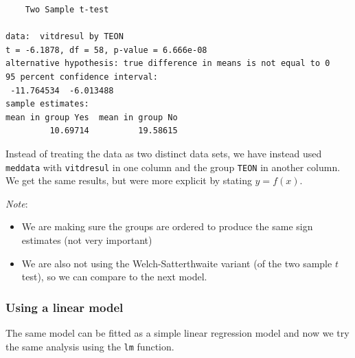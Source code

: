 \documentclass[
  oneside]{krantz}
\newenvironment{Shaded}{\begin{snugshade}}{\end{snugshade}}
\newcommand{\AttributeTok}[1]{\textcolor[rgb]{0.77,0.63,0.00}{#1}}
\newcommand{\FunctionTok}[1]{\textcolor[rgb]{0.00,0.00,0.00}{#1}}
\newcommand{\NormalTok}[1]{#1}
\newcommand{\OtherTok}[1]{\textcolor[rgb]{0.56,0.35,0.01}{#1}}
\newcommand{\SpecialCharTok}[1]{\textcolor[rgb]{0.00,0.00,0.00}{#1}}
\newcommand{\StringTok}[1]{\textcolor[rgb]{0.31,0.60,0.02}{#1}}
\providecommand{\tightlist}{%
  \setlength{\itemsep}{0pt}\setlength{\parskip}{0pt}}
\begin{document}
\begin{verbatim}
    Two Sample t-test

data:  vitdresul by TEON
t = -6.1878, df = 58, p-value = 6.666e-08
alternative hypothesis: true difference in means is not equal to 0
95 percent confidence interval:
 -11.764534  -6.013488
sample estimates:
mean in group Yes  mean in group No 
         10.69714          19.58615 
\end{verbatim}

Instead of treating the data as two distinct data sets, we have instead used \texttt{meddata} with \texttt{vitdresul} in one column and the group \texttt{TEON} in another column.
We get the same results, but were more explicit by stating \(y = f(x)\).

\emph{Note}:

\begin{itemize}
\tightlist
\item
  We are making sure the groups are ordered to produce the same sign estimates (not very important)
\item
  We are also not using the Welch-Satterthwaite variant (of the two sample \(t\) test), so we can compare to the next model.
\end{itemize}

\hypertarget{using-a-linear-model}{%
\subsubsection{Using a linear model}\label{using-a-linear-model}}

The same model can be fitted as a simple linear regression model and now we try the same analysis using the \texttt{lm} function.

\begin{Shaded}
\end{Shaded}
\end{document}
